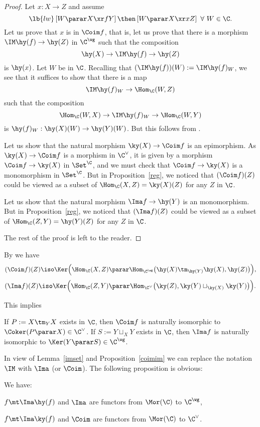 \documentclass[12pt]{article}
\theoremstyle{remark}
\theoremstyle{definition}
\begin{document}
\begin{proof}
Let $x:X\to Z$ and assume 
\begin{equation}\lb{lw}
\left[W\parar X\xr fY\right]\then\left[W\parar X\xr xZ\right]\ \forall\ W\in\C.
\end{equation} 
Let us prove that $x$ is in $\Coim f$, that is, let us prove that there is a morphism $\IM\hy(f)\to\hy(Z)$ in $\C^\wg$ such that the composition 
$$
\hy(X)\to\IM\hy(f)\to\hy(Z)
$$ 
is $\hy(x)$. Let $W$ be in $\C$. Recalling that $(\IM\hy(f))(W):=\IM\hy(f)_W$, we see that it suffices to show that there is a map 
$$
\IM\hy(f)_W\to\Hom_\C(W,Z)
$$ 
such that the composition 
$$
\Hom_\C(W,X)\to\IM\hy(f)_W\to\Hom_\C(W,Y)
$$ 
is $\hy(f)_W:\hy(X)(W)\to\hy(Y)(W)$. But this follows from . 

Let us show that the natural morphism $\ky(X)\to\Coim f$ is an epimorphism. As $\ky(X)\to\Coim f$ is a morphism in $\C^\vee$, it is given by a morphism $\Coim f\to\ky(X)$ in $\Set^\C$, and we must check that $\Coim f\to\ky(X)$ is a monomorphism in $\Set^\C$. But in Proposition~\ref{reg}, we noticed that $(\Coim f)(Z)$ could be viewed as a subset of $\Hom_\C(X,Z)=\ky(X)(Z)$ for any $Z$ in $\C$. 

Let us show that the natural morphism $\Ima f\to\hy(Y)$ is an monomorphism. But in Proposition~\ref{reg}, we noticed that $(\Ima f)(Z)$ could be viewed as a subset of $\Hom_\C(Z,Y)=\hy(Y)(Z)$ for any $Z$ in $\C$. 

The rest of the proof is left to the reader.
\end{proof}

By  we have 
$$ 
(\Coim f)(Z)\iso\Ker\Big(\Hom_\C(X,Z)\parar\Hom_{\C^\wg}\big(\hy(X)\tm_{\hy(Y)}\hy(X),\hy(Z)\big)\Big), 
$$ 
$$ 
(\Ima f)(Z)\iso\Ker\Big(\Hom_\C(Z,Y)\parar\Hom_{\C^\vee}\big(\ky(Z),\ky(Y)\sqcup_{\ky(X)}\ky(Y)\big)\Big). 
$$
 
This implies 

\begin{prop}
If $P:=X\tm_YX$ exists in $\C$, then $\Coim f$ is naturally isomorphic to $\Coker(P\parar X)\in\C^\vee$. If $S:=Y\sqcup_XY$ exists in $\C$, then $\Ima f$ is naturally isomorphic to $\Ker(Y\parar S)\in\C^\wg$. 
\end{prop} 

In view of Lemma~\ref{imset} and Proposition~\ref{coimim} we can replace the notation $\IM$ with $\Ima$ (or $\Coim$). The following proposition is obvious: 

\begin{prop}
We have: 

$f\mt\Ima\hy(f)$ and $\Ima$ are functors from $\Mor(\C)$ to $\C^\wg$, 

$f\mt\Ima\ky(f)$ and $\Coim$ are functors from $\Mor(\C)$ to $\C^\vee$. 
\end{prop}
\end{document}
